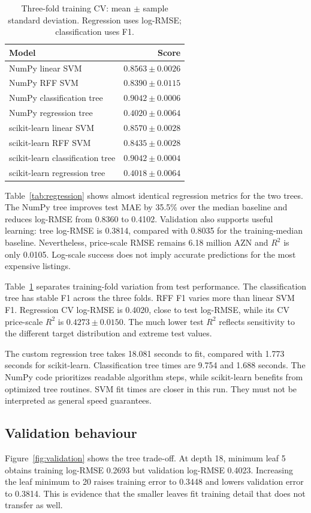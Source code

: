 \documentclass[10pt,twocolumn,a4paper]{article}
\begin{document}
\begin{table}[t]\centering\small
\caption{Three-fold training CV: mean $\pm$ sample standard deviation. Regression uses log-RMSE; classification uses F1.}\label{tab:cv}
\begin{tabular}{@{}lr@{}}\toprule
Model & Score\\\midrule
NumPy linear SVM & $0.8563\pm0.0026$\\
NumPy RFF SVM & $0.8390\pm0.0115$\\
NumPy classification tree & $0.9042\pm0.0006$\\
NumPy regression tree & $0.4020\pm0.0064$\\
scikit-learn linear SVM & $0.8570\pm0.0028$\\
scikit-learn RFF SVM & $0.8435\pm0.0028$\\
scikit-learn classification tree & $0.9042\pm0.0004$\\
scikit-learn regression tree & $0.4018\pm0.0064$\\
\bottomrule\end{tabular}
\end{table}

Table~\ref{tab:regression} shows almost identical regression metrics for the two trees. The NumPy tree improves test MAE by 35.5\% over the median baseline and reduces log-RMSE from 0.8360 to 0.4102. Validation also supports useful learning: tree log-RMSE is 0.3814, compared with 0.8035 for the training-median baseline. Nevertheless, price-scale RMSE remains 6.18 million AZN and $R^2$ is only 0.0105. Log-scale success does not imply accurate predictions for the most expensive listings.

Table~\ref{tab:cv} separates training-fold variation from test performance. The classification tree has stable F1 across the three folds. RFF F1 varies more than linear SVM F1. Regression CV log-RMSE is 0.4020, close to test log-RMSE, while its CV price-scale $R^2$ is $0.4273\pm0.0150$. The much lower test $R^2$ reflects sensitivity to the different target distribution and extreme test values.

The custom regression tree takes 18.081 seconds to fit, compared with 1.773 seconds for scikit-learn. Classification tree times are 9.754 and 1.688 seconds. The NumPy code prioritizes readable algorithm steps, while scikit-learn benefits from optimized tree routines. SVM fit times are closer in this run. They must not be interpreted as general speed guarantees.

\subsection{Validation behaviour}
Figure~\ref{fig:validation} shows the tree trade-off. At depth 18, minimum leaf 5 obtains training log-RMSE 0.2693 but validation log-RMSE 0.4023. Increasing the leaf minimum to 20 raises training error to 0.3448 and lowers validation error to 0.3814. This is evidence that the smaller leaves fit training detail that does not transfer as well.
\end{document}
